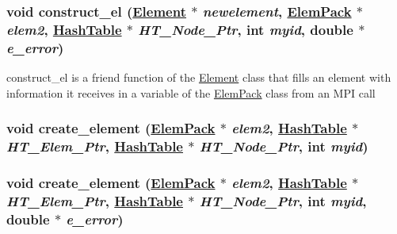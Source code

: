 \hypertarget{update__element__info_8C_a2}{
\subsubsection[construct\_\-el]{\setlength{\rightskip}{0pt plus 5cm}void construct\_\-el (\hyperlink{classElement}{Element} $\ast$ {\em newelement}, \hyperlink{structElemPack}{Elem\-Pack} $\ast$ {\em elem2}, \hyperlink{classHashTable}{Hash\-Table} $\ast$ {\em HT\_\-Node\_\-Ptr}, int {\em myid}, double $\ast$ {\em e\_\-error})}}
\label{update__element__info_8C_a2}


construct\_\-el is a friend function of the \hyperlink{classElement}{Element} class that fills an element with information it receives in a variable of the \hyperlink{structElemPack}{Elem\-Pack} class from an MPI call 

\hypertarget{update__element__info_8C_a6}{
\subsubsection[create\_\-element]{\setlength{\rightskip}{0pt plus 5cm}void create\_\-element (\hyperlink{structElemPack}{Elem\-Pack} $\ast$ {\em elem2}, \hyperlink{classHashTable}{Hash\-Table} $\ast$ {\em HT\_\-Elem\_\-Ptr}, \hyperlink{classHashTable}{Hash\-Table} $\ast$ {\em HT\_\-Node\_\-Ptr}, int {\em myid})}}
\label{update__element__info_8C_a6}


\hypertarget{update__element__info_8C_a5}{
\subsubsection[create\_\-element]{\setlength{\rightskip}{0pt plus 5cm}void create\_\-element (\hyperlink{structElemPack}{Elem\-Pack} $\ast$ {\em elem2}, \hyperlink{classHashTable}{Hash\-Table} $\ast$ {\em HT\_\-Elem\_\-Ptr}, \hyperlink{classHashTable}{Hash\-Table} $\ast$ {\em HT\_\-Node\_\-Ptr}, int {\em myid}, double $\ast$ {\em e\_\-error})}}
\label{update__element__info_8C_a5}


